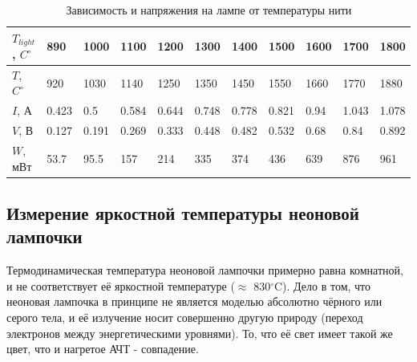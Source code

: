 \documentclass[a4paper, 12pt]{article}
\begin{document}
\begin{enumerate}
\begin{minipage}{0.4\textwidth}
\end{minipage}

\end{enumerate}

\begin{table}[h]
        \centering
        \caption{Зависимость и напряжения на лампе от температуры нити}
        \begin{tabular}{|l|l|l|l|l|l|l|l|l|l|l|}
        \hline
        $T_{light}$, $C^\circ$ & 890    & 1000  & 1100    & 1200    & 1300    & 1400    & 1500    & 1600  & 1700   & 1800    \\ \hline
        $T$, $C^\circ$         & 920    & 1030  & 1140    & 1250    & 1350    & 1450    & 1550    & 1660  & 1770   & 1880    \\ \hline
        $I$, А                 & 0.423  & 0.5   & 0.584   & 0.644   & 0.748   & 0.778   & 0.821   & 0.94  & 1.043  & 1.078   \\ \hline
        $V$, В                 & 0.127  & 0.191 & 0.269   & 0.333   & 0.448   & 0.482   & 0.532   & 0.68  & 0.84   & 0.892   \\ \hline
        $W$, мВт               & 53.7 & 95.5  & 157 & 214 & 335 & 374 & 436 & 639 & 876 & 961 \\ \hline
        \end{tabular}
        \label{table:power}
    \end{table}

\subsection*{Измерение яркостной температуры неоновой лампочки}
Термодинамическая температура неоновой лампочки примерно равна комнатной, и не соответствует её яркостной температуре ($\approx$ 830$^{\circ}$C). Дело в том, что неоновая лампочка в принципе не является моделью абсолютно чёрного или серого тела, и её излучение носит совершенно другую природу (переход электронов между энергетическими уровнями). То, что её свет имеет такой же цвет, что и нагретое АЧТ - совпадение.
\end{document}
